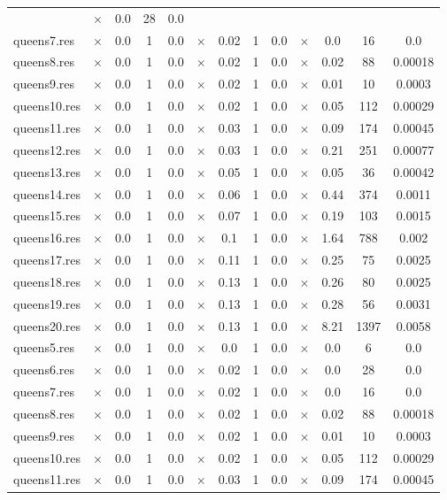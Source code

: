 \documentclass[main.tex]{subfiles}
\begin{document}
\begin{landscape}
\begin{center}
\begin{tabular}{|l|cccc|cccc|cccc|}
 & $\times$ & 0.0 & 28 & 0.0
\\
queens7.res & $\times$ & 0.0 & 1 & 0.0
 & $\times$ & 0.02 & 1 & 0.0
 & $\times$ & 0.0 & 16 & 0.0
\\
queens8.res & $\times$ & 0.0 & 1 & 0.0
 & $\times$ & 0.02 & 1 & 0.0
 & $\times$ & 0.02 & 88 & 0.00018
\\
queens9.res & $\times$ & 0.0 & 1 & 0.0
 & $\times$ & 0.02 & 1 & 0.0
 & $\times$ & 0.01 & 10 & 0.0003
\\
queens10.res & $\times$ & 0.0 & 1 & 0.0
 & $\times$ & 0.02 & 1 & 0.0
 & $\times$ & 0.05 & 112 & 0.00029
\\
queens11.res & $\times$ & 0.0 & 1 & 0.0
 & $\times$ & 0.03 & 1 & 0.0
 & $\times$ & 0.09 & 174 & 0.00045
\\
queens12.res & $\times$ & 0.0 & 1 & 0.0
 & $\times$ & 0.03 & 1 & 0.0
 & $\times$ & 0.21 & 251 & 0.00077
\\
queens13.res & $\times$ & 0.0 & 1 & 0.0
 & $\times$ & 0.05 & 1 & 0.0
 & $\times$ & 0.05 & 36 & 0.00042
\\
queens14.res & $\times$ & 0.0 & 1 & 0.0
 & $\times$ & 0.06 & 1 & 0.0
 & $\times$ & 0.44 & 374 & 0.0011
\\
queens15.res & $\times$ & 0.0 & 1 & 0.0
 & $\times$ & 0.07 & 1 & 0.0
 & $\times$ & 0.19 & 103 & 0.0015
\\
queens16.res & $\times$ & 0.0 & 1 & 0.0
 & $\times$ & 0.1 & 1 & 0.0
 & $\times$ & 1.64 & 788 & 0.002
\\
queens17.res & $\times$ & 0.0 & 1 & 0.0
 & $\times$ & 0.11 & 1 & 0.0
 & $\times$ & 0.25 & 75 & 0.0025
\\
queens18.res & $\times$ & 0.0 & 1 & 0.0
 & $\times$ & 0.13 & 1 & 0.0
 & $\times$ & 0.26 & 80 & 0.0025
\\
queens19.res & $\times$ & 0.0 & 1 & 0.0
 & $\times$ & 0.13 & 1 & 0.0
 & $\times$ & 0.28 & 56 & 0.0031
\\
queens20.res & $\times$ & 0.0 & 1 & 0.0
 & $\times$ & 0.13 & 1 & 0.0
 & $\times$ & 8.21 & 1397 & 0.0058
\\
queens5.res & $\times$ & 0.0 & 1 & 0.0
 & $\times$ & 0.0 & 1 & 0.0
 & $\times$ & 0.0 & 6 & 0.0
\\
queens6.res & $\times$ & 0.0 & 1 & 0.0
 & $\times$ & 0.02 & 1 & 0.0
 & $\times$ & 0.0 & 28 & 0.0
\\
queens7.res & $\times$ & 0.0 & 1 & 0.0
 & $\times$ & 0.02 & 1 & 0.0
 & $\times$ & 0.0 & 16 & 0.0
\\
queens8.res & $\times$ & 0.0 & 1 & 0.0
 & $\times$ & 0.02 & 1 & 0.0
 & $\times$ & 0.02 & 88 & 0.00018
\\
queens9.res & $\times$ & 0.0 & 1 & 0.0
 & $\times$ & 0.02 & 1 & 0.0
 & $\times$ & 0.01 & 10 & 0.0003
\\
queens10.res & $\times$ & 0.0 & 1 & 0.0
 & $\times$ & 0.02 & 1 & 0.0
 & $\times$ & 0.05 & 112 & 0.00029
\\
queens11.res & $\times$ & 0.0 & 1 & 0.0
 & $\times$ & 0.03 & 1 & 0.0
 & $\times$ & 0.09 & 174 & 0.00045
\\
\hline\end{tabular}
\end{center}
\end{landscape}
\end{document}

